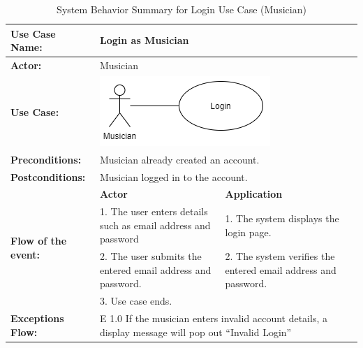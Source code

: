\begin{longtable}{|p{3cm}|p{5cm}|p{5cm}|}
    \caption{\centering System Behavior Summary for Login Use Case (Musician)} \\
    \hline
    \textbf{Use Case Name:} & \multicolumn{2}{l|}{Login as Musician} \\ \hline
    \textbf{Actor:} & \multicolumn{2}{l|}{Musician} \\ \hline
    \textbf{Use Case:} & \multicolumn{2}{l|}{\includegraphics[width=0.5\linewidth]{mainmatter/images/sucd2.png}} \\ \hline
    \textbf{Preconditions:} & \multicolumn{2}{p{10cm}|}{Musician already created an account.} \\ \hline
    \textbf{Postconditions:} & \multicolumn{2}{p{10cm}|}{Musician logged in to the account.} \\ \hline
    \multirow{4}{3cm}{\raggedright \textbf{Flow of the event:}} & \textbf{Actor} & \textbf{Application} \\ \cline{2-3}
    & 1. The user enters details such as email address and password & 1. The system displays the login page. \\ \cline{2-3}
    & 2. The user submits the entered email address and password. & 2. The system verifies the entered email address and password. \\ \cline{2-3}
    & 3. Use case ends. & \\ \hline
    \multirow{1}{3cm}{\raggedright \textbf{Exceptions Flow:}} 
    & \multicolumn{2}{p{10cm}|}{\raggedright E 1.0 If the musician enters invalid account details, a display message will pop out “Invalid Login”} \\ \hline
\end{longtable}
\pagebreak

